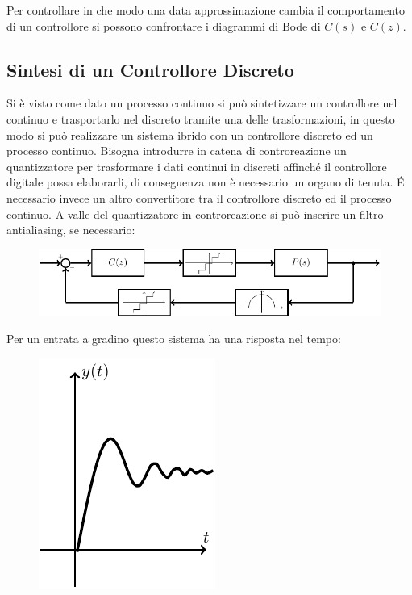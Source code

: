 \documentclass{article}
\numberwithin{equation}{subsection}
\begin{document}
Per controllare in che modo una data approssimazione cambia il comportamento di un controllore si possono confrontare i diagrammi di Bode di $C(s)$ e $C(z)$. 

\subsection{Sintesi di un Controllore Discreto}

Si è visto come dato un processo continuo si può sintetizzare un controllore nel continuo e 
trasportarlo nel discreto tramite una delle trasformazioni, in questo modo 
si può realizzare un sistema ibrido con un controllore discreto ed un processo continuo. Bisogna introdurre in catena di controreazione un quantizzatore per trasformare i 
dati continui in discreti affinché il controllore digitale possa elaborarli, di conseguenza non è necessario un organo di tenuta. \'{E} necessario invece un altro convertitore tra il 
controllore discreto ed il processo continuo. A valle del quantizzatore in controreazione si può inserire un filtro antialiasing, se necessario:

\begin{figure}[H]%
    \centering
    \includegraphics{sistema-discreto-2.pdf}%
\end{figure}

Per un entrata a gradino questo sistema ha una risposta nel tempo:
\begin{figure}[H]%
    \centering
    \includegraphics{risposta-1.pdf}%
\end{figure}
\end{document}
